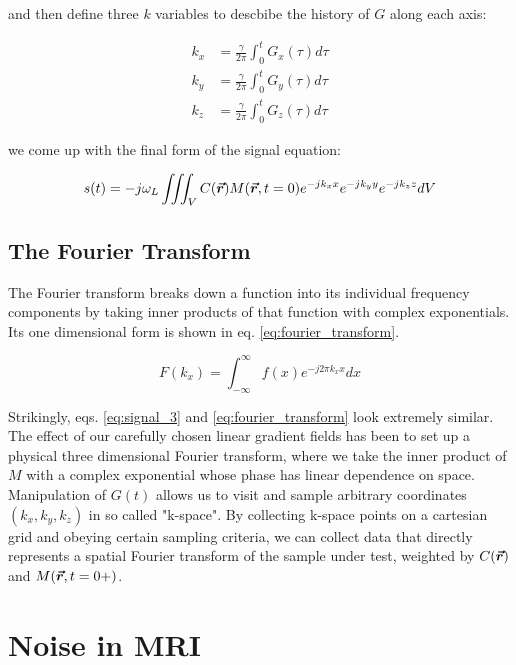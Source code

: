 and then define three $k$ variables to descbibe the history of $G$ along each axis:

\begin{equation}\label{k_space}
    \begin{aligned}
        k_x &= \frac{\gamma}{2\pi} \int_0^t G_x(\tau) d\tau\\
        k_y &= \frac{\gamma}{2\pi} \int_0^t G_y(\tau) d\tau\\
        k_z &= \frac{\gamma}{2\pi} \int_0^t G_z(\tau) d\tau
    \end{aligned}
\end{equation}

we come up with the final form of the signal equation:

\begin{equation}\label{eq:signal_3}
    s(t) = - j \omega_L \iiint_V C(\bm{\vec{r}}) M(\bm{\vec{r}},t=0) e^{-j k_x x} e^{-j k_y y} e^{-j k_z z} dV 
\end{equation}

\subsection{The Fourier Transform}
The Fourier transform breaks down a function into its individual frequency components by taking inner products of that
function with complex exponentials. Its one dimensional form is shown in eq. \ref{eq:fourier_transform}.

\begin{equation}\label{eq:fourier_transform}
    F(k_x) = \int_{-\infty}^{\infty} f(x)e^{-j2\pi k_x x} dx
\end{equation}

Strikingly, eqs. \ref{eq:signal_3} and \ref{eq:fourier_transform} look extremely similar. The effect of our carefully
chosen linear gradient fields has been to set up a physical three dimensional Fourier transform, where we take the inner
product of $M$ with a complex exponential whose phase has linear dependence on space. Manipulation of $G(t)$ allows us
to visit and sample arbitrary coordinates $(k_x,k_y,k_z)$ in so called "k-space".  By collecting k-space points on a
cartesian grid and obeying certain sampling criteria, we can collect data that directly represents a spatial Fourier
transform of the sample under test, weighted by $C(\bm{\vec{r}})$ and $M(\bm{\vec{r}},t=0+)$.

\section{Noise in MRI}
